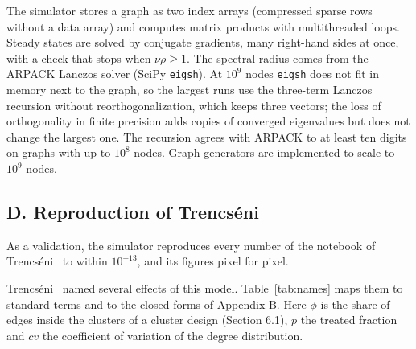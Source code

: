 \documentclass[final,5p,times,twocolumn,number]{elsarticle}
\begin{document}
The simulator stores a graph as two index arrays (compressed sparse rows without a data array) and computes matrix products with multithreaded loops. Steady states are solved by conjugate gradients, many right-hand sides at once, with a check that stops when $\nu\rho \geq 1$. The spectral radius comes from the ARPACK Lanczos solver (SciPy \texttt{eigsh}). At $10^9$  nodes \texttt{eigsh} does not fit in memory next to the graph, so the largest runs use the three-term Lanczos recursion without reorthogonalization, which keeps three vectors; the loss of orthogonality in finite precision adds copies of converged eigenvalues but does not change the largest one. The recursion agrees with ARPACK to at least ten digits on graphs with up to $10^8$  nodes. Graph generators are implemented to scale to $10^9$  nodes.


\subsection*{D. Reproduction of Trencséni~\cite{r20}}

As a validation, the simulator reproduces every number of the notebook of Trencséni~\cite[arXiv:2312.01607v1]{r20} to within $10^{-13}$, and its figures pixel for pixel.


Trencséni~\cite{r20} named several effects of this model. Table~\ref{tab:names} maps them to standard terms and to the closed forms of Appendix B. Here $\phi$  is the share of edges inside the clusters of a cluster design (Section 6.1), $p$  the treated fraction and $cv$  the coefficient of variation of the degree distribution.
\end{document}
